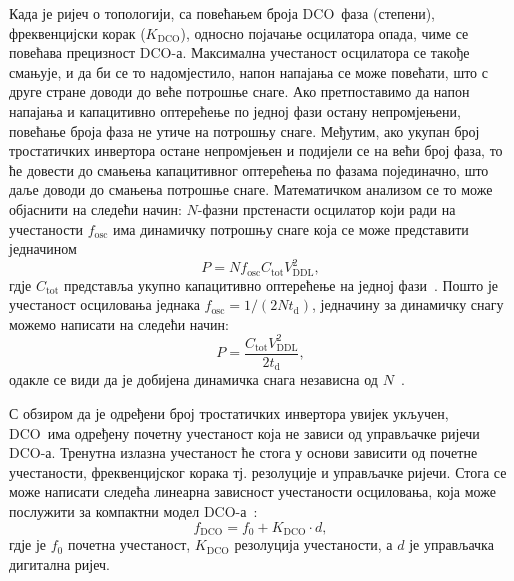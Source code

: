 \documentclass[master]{finthesis}
\def \DCO  {DCO} %
\begin{document}
Када је ријеч о топологији, са повећањем броја \DCO\ фаза (степени), фреквенцијски корак ($K_\text{DCO}$), односно појачање осцилатора опада, чиме се повећава прецизност \DCO-а. Максимална учестаност осцилатора се такође смањује, и да би се то надомјестило, напон напајања се може повећати, што с друге стране доводи до веће потрошње снаге. Ако претпоставимо да напон напајања и капацитивно оптерећење по једној фази остану непромјењени, повећање броја фаза не утиче на потрошњу снаге. Међутим, ако укупан број тростатичких инвертора остане непромјењен и подијели се на већи број фаза, то ће довести до смањења капацитивног оптерећења по фазама појединачно, што даље доводи до смањења потрошње снаге. Математичком анализом се то може објаснити на следећи начин: $N$-фазни прстенасти осцилатор који ради на учестаности $f_\text{osc}$ има динамичку потрошњу снаге која се може представити једначином
\begin{equation} 
	\label{eq:dco:dynamic_pwr_1}
    	P = N f_\text{osc} C_\text{tot} V^{2}_\text{DDL}, 
\end{equation}
гдје $C_\text{tot}$ представља укупно капацитивно оптерећење на једној фази~\cite{RABAEY:2003digital}. Пошто је учестаност осциловања једнака $f_\text{osc} = 1/(2Nt_\text{d})$, једначину за динамичку снагу можемо написати на следећи начин:
\begin{equation}
    	P = \frac{C_\text{tot}V^{2}_\text{DDL}}{2t_\text{d}},
\end{equation}
одакле се види да је добијена динамичка снага независна од $N$~\cite{Razavi:PLL_CMOS_2020}. \par
С обзиром да је одређени број тростатичких инвертора увијек укључен, \DCO\ има одређену почетну учестаност која не зависи од управљачке ријечи \DCO-а. Тренутна излазна учестаност ће стога у основи зависити од почетне учестаности, фреквенцијског корака тј. резолуције и управљачке ријечи. Стога се може написати следећа линеарна зависност учестаности осциловања, која може послужити за компактни модел \DCO-а~:  
\begin{equation} \label{f_dco}
	f_\text{DCO} = f_\text{0} + K_\text{DCO} \cdot d,
\end{equation} 
гдје је $f_\text{0}$ почетна учестаност, $K_\text{DCO}$ резолуција учестаности, а $d$ је управљачка дигитална ријеч.
\end{document}
